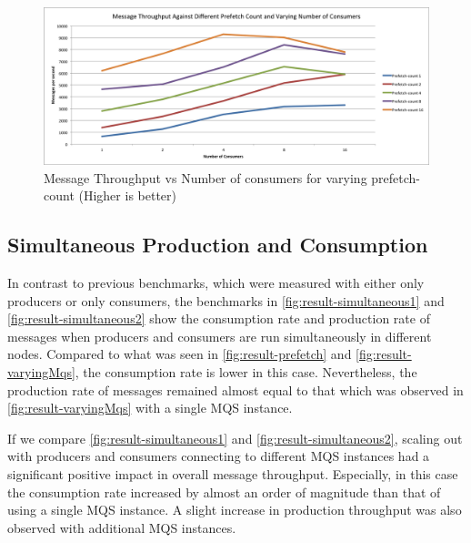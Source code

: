 \begin{figure}[H]
  \centering
  \includegraphics[width=1\textwidth]{figures/01prefetch}
  \caption[Message Throughput vs Number of consumers for varying prefetch-count]{Message Throughput vs Number of consumers for varying prefetch-count (Higher is better)}
  \label{fig:result-prefetch}
\end{figure}


\subsection{Simultaneous Production and Consumption}
\label{subsec:simultaneous}
  In contrast to previous benchmarks, which were measured with either only producers or only consumers, the benchmarks in \autoref{fig:result-simultaneous1} and \autoref{fig:result-simultaneous2} show the consumption rate and production rate of messages when producers and consumers are run simultaneously in different nodes. Compared to what was seen in \autoref{fig:result-prefetch} and
  \autoref{fig:result-varyingMqs}, the consumption rate is lower in this case. Nevertheless, the production rate of messages remained almost equal to that which was observed in \autoref{fig:result-varyingMqs} with a single MQS instance.

  If we compare \autoref{fig:result-simultaneous1} and \autoref{fig:result-simultaneous2}, scaling out with producers and consumers connecting to different MQS instances had a significant positive impact in overall message throughput. Especially, in this case the consumption rate increased by almost an order of magnitude than that of using a single MQS instance. A slight increase in production throughput was also observed with additional MQS instances.

